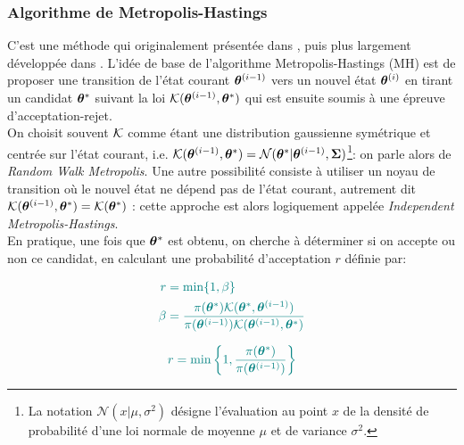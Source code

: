 \subsubsection{Algorithme de Metropolis-Hastings}

C'est une méthode qui  originalement présentée dans \cite{Metropolis1953}, puis plus largement développée dans \cite{Hastings1970}. L'idée de base de l'algorithme Metropolis-Hastings (MH) est de proposer une transition de l'état courant ${{\bm{\theta}}^{(i-1)}}$ vers un nouvel état ${\bm{\theta}}^{(i)}$ en tirant un candidat ${{\bm{\theta}}^*}$ suivant la loi ${\mathcal{K}}({{\bm{\theta}}^{(i-1)}}, {{\bm{\theta}}^*})$ qui est ensuite soumis à une épreuve d'acceptation-rejet. \\

On choisit souvent ${\mathcal{K}}$ comme étant une distribution gaussienne symétrique et centrée sur l'état courant, i.e. ${\mathcal{K}}({{\bm{\theta}}^{(i-1)}}, {{\bm{\theta}}^*}) = \mathcal{N}({{\bm{\theta}}^*} | {{\bm{\theta}}^{(i-1)}}, {\bm{\Sigma}})$\footnote{La notation $\mathcal{N}(x|\mu,\sigma^2)$ désigne l'évaluation au point $x$ de la densité de probabilité d'une loi normale de moyenne $\mu$ et de variance $\sigma^2$.}: on parle alors de \textit{Random Walk Metropolis}. Une autre possibilité consiste à utiliser un noyau de transition où le nouvel état ne dépend pas de l'état courant, autrement dit ${\mathcal{K}}({{\bm{\theta}}^{(i-1)}}, {{\bm{\theta}}^*}) = {\mathcal{K}}({{\bm{\theta}}^*})$ : cette approche est alors logiquement appelée \textit{Independent Metropolis-Hastings}. \\

En pratique, une fois que ${{\bm{\theta}}^*}$ est obtenu, on cherche à déterminer si on accepte ou non ce candidat, en calculant une probabilité d'acceptation $r$ définie par:

\begin{equation}
\NdFS{
\label{eq_acceptation_MH}
\begin{split}
r & =\min\{1,\beta\} \\
\beta & =\dfrac{\pi(\VecThetaCandidat)\kernel(\VecThetaCandidat, \VecThetaCourant)}{\pi(\VecThetaCourant)\kernel(\VecThetaCourant, \VecThetaCandidat)}
\end{split}
}
\end{equation}

\begin{equation}
\NdFS{
	r = \min\left\{1,\dfrac{\pi(\VecThetaCandidat)}{\pi(\VecThetaCourant)}\right\}
	\label{eq_acceptation_metropolis}
}
\end{equation}


